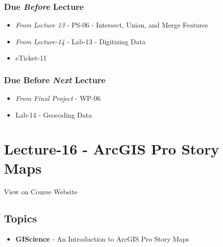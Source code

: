 \documentclass[]{book}
\providecommand{\tightlist}{%
  \setlength{\itemsep}{0pt}\setlength{\parskip}{0pt}}
\begin{document}
\hypertarget{due-before-lecture-14}{%
\subsubsection*{\texorpdfstring{Due \emph{Before} Lecture}{Due Before Lecture}}\label{due-before-lecture-14}}

\begin{itemize}
\tightlist
\item
  \emph{From Lecture 13} - PS-06 - Intersect, Union, and Merge Features
\item
  \emph{From Lecture-14} - Lab-13 - Digitizing Data
\item
  eTicket-11
\end{itemize}

\hypertarget{due-before-next-lecture-13}{%
\subsubsection*{\texorpdfstring{Due Before \emph{Next} Lecture}{Due Before Next Lecture}}\label{due-before-next-lecture-13}}

\begin{itemize}
\tightlist
\item
  \emph{From Final Project} - WP-06
\item
  Lab-14 - Geocoding Data
\end{itemize}

\hypertarget{lecture-16---arcgis-pro-story-maps}{%
\section*{Lecture-16 - ArcGIS Pro Story Maps}\label{lecture-16---arcgis-pro-story-maps}}

View on Course Website

\hypertarget{topics-16}{%
\subsection*{Topics}\label{topics-16}}

\begin{itemize}
\tightlist
\item
  \textbf{GIScience} - An Introduction to ArcGIS Pro Story Maps
\end{itemize}
\end{document}
